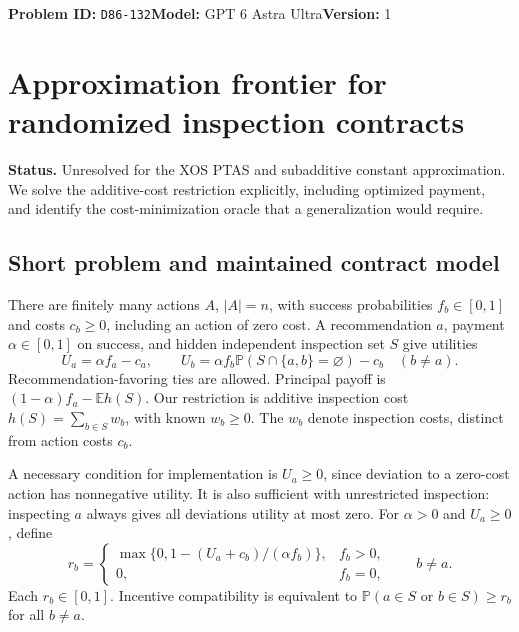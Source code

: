\documentclass[11pt,a4paper]{article}
\newcommand{\E}{\mathbb E}
\newcommand{\Prb}{\mathbb P}
\begin{document}
\noindent\textbf{Problem ID:} \texttt{D86-132}\quad\textbf{Model:} GPT 6 Astra Ultra\quad\textbf{Version:} 1\par
\section*{Approximation frontier for randomized inspection contracts}

\textbf{Status.} Unresolved for the XOS PTAS and subadditive constant approximation. We solve the additive-cost restriction explicitly, including optimized payment, and identify the cost-minimization oracle that a generalization would require.

\subsection*{Short problem and maintained contract model}
There are finitely many actions $A$, $|A|=n$, with success probabilities $f_b\in[0,1]$ and costs $c_b\geq0$, including an action of zero cost. A recommendation $a$, payment $\alpha\in[0,1]$ on success, and hidden independent inspection set $S$ give utilities
\[
 U_a=\alpha f_a-c_a,\qquad
 U_b=\alpha f_b\Prb(S\cap\{a,b\}=\varnothing)-c_b\quad(b\ne a).
\]
Recommendation-favoring ties are allowed. Principal payoff is $(1-\alpha)f_a-\E h(S)$. Our restriction is additive inspection cost $h(S)=\sum_{b\in S}w_b$, with known $w_b\geq0$. The $w_b$ denote inspection costs, distinct from action costs $c_b$.

A necessary condition for implementation is $U_a\geq0$, since deviation to a zero-cost action has nonnegative utility. It is also sufficient with unrestricted inspection: inspecting $a$ always gives all deviations utility at most zero. For $\alpha>0$ and $U_a\geq0$, define
\[
 r_b=\begin{cases}
 \max\{0,1-(U_a+c_b)/(\alpha f_b)\},&f_b>0,\\
 0,&f_b=0,
 \end{cases}\qquad b\ne a.
\]
Each $r_b\in[0,1]$. Incentive compatibility is equivalent to
$\Prb(a\in S\text{ or }b\in S)\geq r_b$ for all $b\ne a$.
\end{document}
